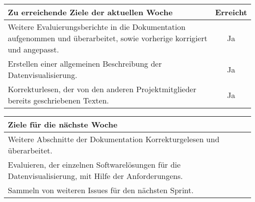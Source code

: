 \begin{tabularx}{\textwidth}{Xc}
    \arrayrulecolor{OliveGreen}
    \toprule
    {\bfseries Zu erreichende Ziele der aktuellen Woche} & {\bfseries Erreicht} \\
    \midrule[2pt]
    Weitere Evaluierungsberichte in die Dokumentation aufgenommen und
    überarbeitet, sowie vorherige korrigiert und angepasst.   &Ja             \\
    \rowcolor{OliveGreen!15}
    Erstellen einer allgemeinen Beschreibung der Datenvisualisierung. &Ja     \\
    \rowcolor{White}
    Korrekturlesen, der von den anderen Projektmitglieder bereits geschriebenen
    Texten. &Ja \\
   \bottomrule[2pt]
\end{tabularx}
%
\vspace{1cm}
%
\begin{tabularx}{\textwidth}{Xc}
    \arrayrulecolor{OliveGreen}
    \toprule
    {\bfseries Ziele für die nächste Woche}        &                         \\
    \midrule[2pt]
    Weitere Abschnitte der Dokumentation Korrekturgelesen und überarbeitet. & \\
    \rowcolor{OliveGreen!15}
    Evaluieren, der einzelnen Softwarelösungen für die Datenvisualisierung, mit
    Hilfe der Anforderungens.  &                         \\
    \rowcolor{White}
    Sammeln von weiteren Issues für den nächsten Sprint. & \\
\end{tabularx}

